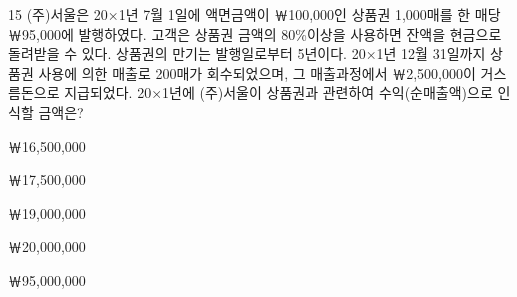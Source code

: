 \begin{question}{15}
(주)서울은 20×1년 7월 1일에 액면금액이 ￦100,000인 상품권 1,000매를 한 매당 ￦95,000에 발행하였다. 고객은 상품권 금액의 80\%이상을 사용하면 잔액을 현금으로 돌려받을 수 있다. 상품권의 만기는 발행일로부터 5년이다. 20×1년 12월 31일까지 상품권 사용에 의한 매출로 200매가 회수되었으며, 그 매출과정에서 ￦2,500,000이 거스름돈으로 지급되었다. 20×1년에 (주)서울이 상품권과 관련하여 수익(순매출액)으로 인식할 금액은?
\begin{choices}
  \item ￦16,500,000
  \item ￦17,500,000
  \item ￦19,000,000
  \item ￦20,000,000
  \item ￦95,000,000
\end{choices}
\end{question}
